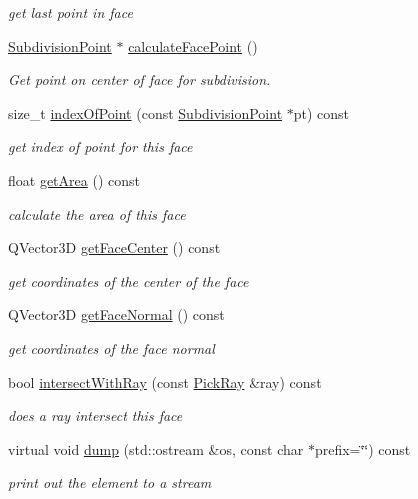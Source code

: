 \begin{DoxyCompactItemize}
\begin{DoxyCompactList}\small\item\em get last point in face \end{DoxyCompactList}\item 
\hyperlink{classShipCAD_1_1SubdivisionPoint}{Subdivision\+Point} $\ast$ \hyperlink{classShipCAD_1_1SubdivisionFace_aeb9c6f01f3896dc39819265922a04892}{calculate\+Face\+Point} ()
\begin{DoxyCompactList}\small\item\em Get point on center of face for subdivision. \end{DoxyCompactList}\item 
size\+\_\+t \hyperlink{classShipCAD_1_1SubdivisionFace_a13b147bdc2d5fda0dcbc6de240bc05cd}{index\+Of\+Point} (const \hyperlink{classShipCAD_1_1SubdivisionPoint}{Subdivision\+Point} $\ast$pt) const 
\begin{DoxyCompactList}\small\item\em get index of point for this face \end{DoxyCompactList}\item 
float \hyperlink{classShipCAD_1_1SubdivisionFace_a1f27fc04bf353dd6295da574fa97c1f8}{get\+Area} () const 
\begin{DoxyCompactList}\small\item\em calculate the area of this face \end{DoxyCompactList}\item 
Q\+Vector3D \hyperlink{classShipCAD_1_1SubdivisionFace_ab22c43ec3d209a9f7b0b9bfe5d609508}{get\+Face\+Center} () const 
\begin{DoxyCompactList}\small\item\em get coordinates of the center of the face \end{DoxyCompactList}\item 
Q\+Vector3D \hyperlink{classShipCAD_1_1SubdivisionFace_a94b07cf08781a9d80caf14a8f97df148}{get\+Face\+Normal} () const 
\begin{DoxyCompactList}\small\item\em get coordinates of the face normal \end{DoxyCompactList}\item 
bool \hyperlink{classShipCAD_1_1SubdivisionFace_aba3fbf26d70b4eb3ef245c7f7cb16e03}{intersect\+With\+Ray} (const \hyperlink{structShipCAD_1_1PickRay}{Pick\+Ray} \&ray) const 
\begin{DoxyCompactList}\small\item\em does a ray intersect this face \end{DoxyCompactList}\item 
virtual void \hyperlink{classShipCAD_1_1SubdivisionFace_aa5bd261ae5fc0a1c7fe8cc5328b8477f}{dump} (std\+::ostream \&os, const char $\ast$prefix=\char`\"{}\char`\"{}) const 
\begin{DoxyCompactList}\small\item\em print out the element to a stream \end{DoxyCompactList}\end{DoxyCompactItemize}
